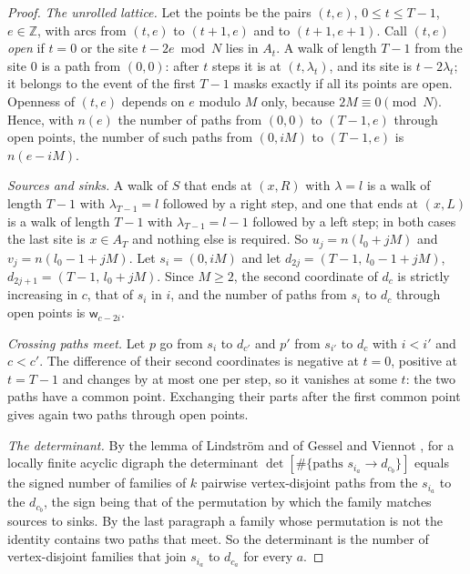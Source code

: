 \begin{proof}
\emph{The unrolled lattice.} Let the points be the pairs $(t,e)$, $0\le t\le T-1$, $e\in\mathbb{Z}$, with arcs from $(t,e)$ to $(t+1,e)$ and to $(t+1,e+1)$. Call $(t,e)$ \emph{open} if $t=0$ or the site $t-2e \bmod N$ lies in $A_t$. A walk of length $T-1$ from the site $0$ is a path from $(0,0)$: after $t$ steps it is at $(t,\lambda_t)$, and its site is $t-2\lambda_t$; it belongs to the event of the first $T-1$ masks exactly if all its points are open. Openness of $(t,e)$ depends on $e$ modulo $M$ only, because $2M\equiv0\pmod N$. Hence, with $n(e)$ the number of paths from $(0,0)$ to $(T-1,e)$ through open points, the number of such paths from $(0,iM)$ to $(T-1,e)$ is $n(e-iM)$.

\emph{Sources and sinks.} A walk of $S$ that ends at $(x,R)$ with $\lambda=l$ is a walk of length $T-1$ with $\lambda_{T-1}=l$ followed by a right step, and one that ends at $(x,L)$ is a walk of length $T-1$ with $\lambda_{T-1}=l-1$ followed by a left step; in both cases the last site is $x\in A_T$ and nothing else is required. So $u_j=n(l_0+jM)$ and $v_j=n(l_0-1+jM)$. Let $s_i=(0,iM)$ and let $d_{2j}=(T-1,\,l_0-1+jM)$, $d_{2j+1}=(T-1,\,l_0+jM)$. Since $M\ge2$, the second coordinate of $d_c$ is strictly increasing in $c$, that of $s_i$ in $i$, and the number of paths from $s_i$ to $d_c$ through open points is $\mathsf{w}_{c-2i}$.

\emph{Crossing paths meet.} Let $p$ go from $s_i$ to $d_{c'}$ and $p'$ from $s_{i'}$ to $d_c$ with $i<i'$ and $c<c'$. The difference of their second coordinates is negative at $t=0$, positive at $t=T-1$ and changes by at most one per step, so it vanishes at some $t$: the two paths have a common point. Exchanging their parts after the first common point gives again two paths through open points.

\emph{The determinant.} By the lemma of Lindstr\"om and of Gessel and Viennot \cite{lgv}, for a locally finite acyclic digraph the determinant $\det[\#\{\text{paths }s_{i_a}\to d_{c_b}\}]$ equals the signed number of families of $k$ pairwise vertex-disjoint paths from the $s_{i_a}$ to the $d_{c_b}$, the sign being that of the permutation by which the family matches sources to sinks. By the last paragraph a family whose permutation is not the identity contains two paths that meet. So the determinant is the number of vertex-disjoint families that join $s_{i_a}$ to $d_{c_a}$ for every $a$.
\end{proof}


